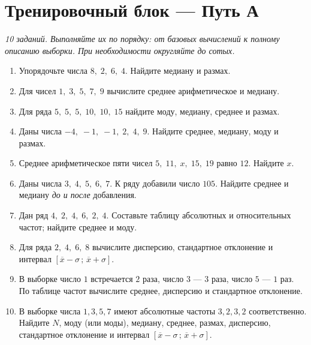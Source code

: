 \documentclass[a4paper,12pt]{article}
\newcommand{\mysection}[1]{\vspace{5pt}\section*{\textcolor{darkaccent}{#1}}\vspace{-5pt}}
\newcommand{\xbar}{\overline{x}}
\begin{document}
\clearpage
\mysection{Тренировочный блок --- Путь А}
\textit{10 заданий. Выполняйте их по порядку: от базовых вычислений к полному описанию выборки. При необходимости округляйте до сотых.}
\begin{enumerate}[label=\textbf{\arabic*.},itemsep=12pt]
\item Упорядочьте числа $8,\;2,\;6,\;4$. Найдите медиану и размах.
\item Для чисел $1,\;3,\;5,\;7,\;9$ вычислите среднее арифметическое и медиану.
\item Для ряда $5,\;5,\;5,\;10,\;10,\;15$ найдите моду, медиану, среднее и размах.
\item Даны числа $-4,\;-1,\;-1,\;2,\;4,\;9$. Найдите среднее, медиану, моду и размах.
\item Среднее арифметическое пяти чисел $5,\;11,\;x,\;15,\;19$ равно $12$. Найдите $x$.
\item Даны числа $3,\;4,\;5,\;6,\;7$. К ряду добавили число $105$. Найдите среднее и медиану \emph{до и после} добавления.
\item Дан ряд $4,\;2,\;4,\;6,\;2,\;4$. Составьте таблицу абсолютных и относительных частот; найдите среднее и моду.
\item Для ряда $2,\;4,\;6,\;8$ вычислите дисперсию, стандартное отклонение и интервал $[\xbar-\sigma\,;\,\xbar+\sigma]$.
\item В выборке число $1$ встречается $2$ раза, число $3$ --- $3$ раза, число $5$ --- $1$ раз. По таблице частот вычислите среднее, дисперсию и стандартное отклонение.
\item В выборке числа $1,3,5,7$ имеют абсолютные частоты $3,2,3,2$ соответственно. Найдите $N$, моду (или моды), медиану, среднее, размах, дисперсию, стандартное отклонение и интервал $[\xbar-\sigma\,;\,\xbar+\sigma]$.
\end{enumerate}
\end{document}
